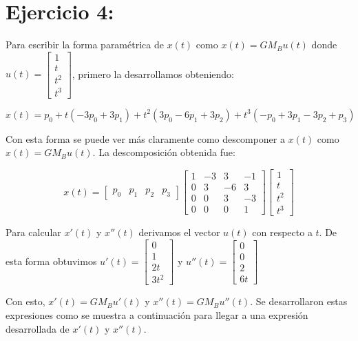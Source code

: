 \documentclass{article}
\begin{document}
\section*{Ejercicio 4:}
Para escribir la forma paramétrica de $x(t)$ como  $x(t) = G M_B u(t)$ donde $u(t) =
\left[ 
\begin{array}{c}
1 \\
t \\
t^2 \\
t^3
\end{array}
\right]
$, primero la desarrollamos obteniendo:

$$
x(t) = p_0 + t(-3p_0+3p_1) + t^2(3p_0-6p_1+3p_2) + t^3(-p_0+3p_1-3p_2+p_3)
$$

Con esta forma se puede ver más claramente como descomponer a  $x(t)$ como  $x(t) = G M_B u(t)$. La descomposición obtenida fue:

$$
x(t) = 
\begin{bmatrix}
p_0 & p_1 & p_2 & p_3
\end{bmatrix}
\begin{bmatrix}
1 & -3 & 3 & -1 \\
0 & 3 & -6 & 3 \\
0 & 0 & 3 & -3 \\
0 & 0 & 0 & 1
\end{bmatrix}
\begin{bmatrix}
1 \\
t \\
t^2 \\
t^3
\end{bmatrix}
$$

Para calcular $x'(t)$ y $x''(t)$  derivamos el vector $u(t)$ con respecto a $t$. De esta forma obtuvimos $u'(t) =
\begin{bmatrix}
0 \\ 1 \\ 2t \\ 3t^2
\end{bmatrix}
$ y $u''(t) =
\begin{bmatrix}
0 \\ 0 \\ 2 \\ 6t
\end{bmatrix}
$

Con esto, $x'(t) = G M_B u'(t)$ y $x''(t) = G M_B u''(t)$. Se desarrollaron estas expresiones como se muestra a continuación para llegar a una expresión desarrollada de $x'(t)$ y $x''(t)$.
\end{document}

